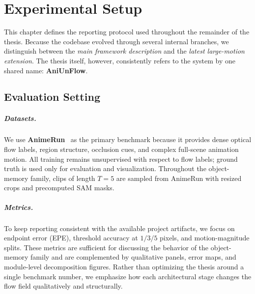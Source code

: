 \chapter{Experimental Setup}

This chapter defines the reporting protocol used throughout the remainder of the thesis. Because the codebase evolved through several internal branches, we distinguish between the \emph{main framework description} and the \emph{latest large-motion extension}. The thesis itself, however, consistently refers to the system by one shared name: \textbf{AniUnFlow}.

\section{Evaluation Setting}

\paragraph{Datasets.}
We use \textbf{AnimeRun}~\cite{animerun} as the primary benchmark because it provides dense optical flow labels, region structure, occlusion cues, and complex full-scene animation motion. All training remains unsupervised with respect to flow labels; ground truth is used only for evaluation and visualization. Throughout the object-memory family, clips of length $T=5$ are sampled from AnimeRun with resized crops and precomputed SAM masks.

\paragraph{Metrics.}
To keep reporting consistent with the available project artifacts, we focus on endpoint error (EPE), threshold accuracy at $1/3/5$ pixels, and motion-magnitude splits. These metrics are sufficient for discussing the behavior of the object-memory family and are complemented by qualitative panels, error maps, and module-level decomposition figures. Rather than optimizing the thesis around a single benchmark number, we emphasize how each architectural stage changes the flow field qualitatively and structurally.


